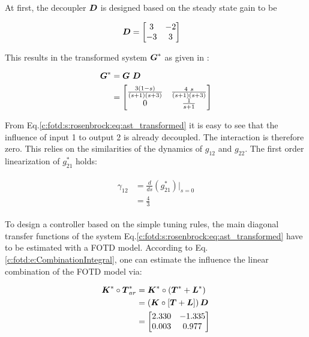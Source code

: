 At first, the decoupler $\mbox{\boldmath$D$}$ is designed based on the steady state gain to be 

\begin{align}
\begin{split}
\mbox{\boldmath$D$} &= \begin{bmatrix}
3 & -2 \\
-3 & 3
\end{bmatrix}
\end{split}
\label{c:fotd:s:rosenbrock:eq:ast_decoupler}
\end{align}

This results in the transformed system $\mbox{\boldmath$G$}^*$ as given in \cite{Astrom2001a}:

\begin{align}
\begin{split}
\mbox{\boldmath$G$}^* &= \mbox{\boldmath$G$} ~\mbox{\boldmath$D$} \\
&= \begin{bmatrix}
\frac{3\left(1-s\right)}{\left(s+1\right)\left(s+3\right)} & \frac{4~s}{\left(s+1\right)\left(s+3\right)} \\
0 &   \frac{1}{s+1}
\end{bmatrix}
\end{split}
\label{c:fotd:s:rosenbrock:eq:ast_transformed}
\end{align}

From Eq.\ref{c:fotd:s:rosenbrock:eq:ast_transformed} it is easy to see that the influence of input 1 to output 2 is already decoupled. The interaction is therefore zero. This relies on the similarities of the dynamics of $g_{12}$ and $g_{22}$. The first order linearization of $g_{21}^*$ holds:

\begin{align}
\begin{split}
\gamma_{12} &= \frac{d}{ds}\left(g_{21}^*\right) |_{s=0} \\
&= \frac{4}{3}
\end{split}
\label{c:fotd:rosenbrock:eq:ast_interaction}
\end{align}

To design a controller based on the simple tuning rules, the main diagonal transfer functions of the system Eq.\ref{c:fotd:s:rosenbrock:eq:ast_transformed} have to be estimated with a FOTD model. According to Eq. \ref{c:fotd:e:CombinationIntegral}, one can estimate the influence the linear combination of the FOTD model via:

\begin{align}
\begin{split}
\mbox{\boldmath$K$}^* \circ \mbox{\boldmath$T$}_{ar}^{*} &= \mbox{\boldmath$K$}^* \circ \left( \mbox{\boldmath$T$}^* + \mbox{\boldmath$L$}^* \right)\\
&=  \left( \mbox{\boldmath$K$} \circ \left[ \mbox{\boldmath$T$} + \mbox{\boldmath$L$} \right] \right) \mbox{\boldmath$D$} \\
&= \begin{bmatrix} 
2.330 & -1.335 \\ 
0.003 & 0.977	
\end{bmatrix}
\end{split}
\label{c:fotd:s:rosenbrock:eq:ast_approx}
\end{align}



